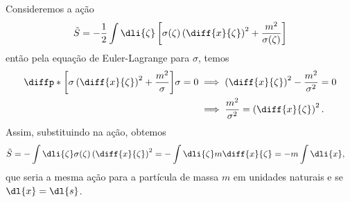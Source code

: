 Consideremos a ação
\begin{equation*}
    \tilde{S} = -\frac12 \int \dli{\zeta}\left[\sigma(\zeta)\left(\diff{x}{\zeta}\right)^2 + \frac{m^2}{\sigma(\zeta)}\right]
\end{equation*}
então pela equação de Euler-Lagrange para \(\sigma\), temos
\begin{align*}
    \diffp*{\left[\sigma\left(\diff{x}{\zeta}\right)^2 + \frac{m^2}{\sigma}\right]}{\sigma} = 0 &\implies \left(\diff{x}{\zeta}\right)^2 - \frac{m^2}{\sigma^2} = 0\\
                                                                                                &\implies \frac{m^2}{\sigma^2} = \left(\diff{x}{\zeta}\right)^2.
\end{align*}
Assim, substituindo na ação, obtemos
\begin{align*}
    \tilde{S} &= -\int\dli{\zeta} \sigma(\zeta) \left(\diff{x}{\zeta}\right)^2 = -\int\dli{\zeta} m\diff{x}{\zeta} = -m \int \dli{x},
\end{align*}
que seria a mesma ação para a partícula de massa \(m\) em unidades naturais e se \(\dl{x} = \dl{s}\).
